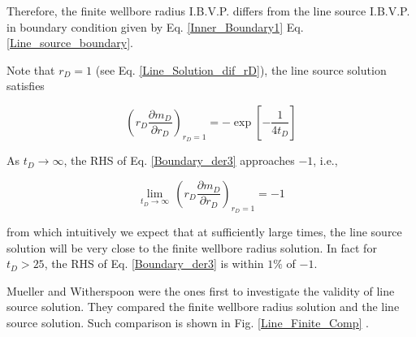 \documentclass{llncs}
\numberwithin{equation}{section}
\numberwithin{figure}{section}
\numberwithin{table}{section}
\begin{document}
    Therefore, the finite wellbore radius I.B.V.P. differs from the line source I.B.V.P. in  boundary condition  given by Eq. \ref{Inner_Boundary1} Eq. \ref{Line_source_boundary}.
    
    Note that $r_{D}=1$ (see Eq. \ref{Line_Solution_dif_rD}), the line source solution satisfies

    \begin{equation}
        {{\left( {{r}_{D}}\frac{\partial {{ m }_{D}}}{\partial {{r}_{D}}} \right)}_{{{r}_{D}}=1}}=-\exp \left[ -\frac{1}{4{{t}_{D}}} \right]
        \label{Boundary_der3}
    \end{equation}      
    
    As $t_{D}\rightarrow\infty$, the RHS of Eq. \ref{Boundary_der3} approaches $-1$, i.e.,
    
    \begin{equation}    
    \underset{{{t}_{D}}\to \infty }{\mathop{\lim }}\,{{\left( {{r}_{D}}\frac{\partial {{ m }_{D}}}{\partial {{r}_{D}}} \right)}_{{{r}_{D}}=1}}=-1
        \label{Boundary_der4}
    \end{equation}
        
    from which intuitively we expect that at sufficiently large times, the line source solution  will be very close to the finite wellbore radius solution. In fact for $t_{D}>25$, the RHS of Eq. \ref{Boundary_der3} is within $1\%$ of $-1$.
    
    Mueller and Witherspoon \cite{Mueller_1965_1} were the ones first to investigate the validity of line source solution. They compared the finite wellbore radius solution and the line source solution. Such comparison is shown in Fig. \ref{Line_Finite_Comp} .
        
\end{document}
